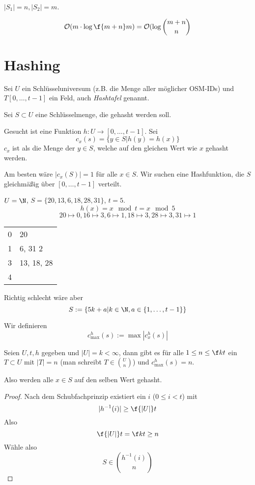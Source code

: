 \documentclass{mycourse}
\renewcommand{\O}{\mathcal{O}}
\begin{document}


\begin{note}[Nachtrag]
	$|S_1| = n, |S_2| = m$.

	\[
		\O(m\cdot \log \f{m+n}m) = \O (\log \binom{m+n}{n}
	\]
\end{note}


\section{Hashing}

Sei $U$ ein Schlüsseluniversum (z.B. die Menge aller möglicher OSM-IDs) und $T[0,\dotsc, t-1]$ ein Feld, auch \emph{Hashtafel} genannt.

Sei $S\subset U$ eine Schlüsselmenge, die gehasht werden soll.

Gesucht ist eine Funktion $h: U \to [0,\dotsc, t-1]$.
Sei 
\[
	c_x(s) = \{y\in S | h(y) = h(x)\}
\]
$c_x$ ist als die Menge der $y\in S$, welche auf den gleichen Wert wie $x$ gehasht werden.

Am besten wäre $|c_x(S)| = 1$ für alle $x\in S$.
Wir suchen eine Hashfunktion, die $S$ gleichmäßig über $[0,\dotsc, t-1]$ verteilt.

\begin{ex}
	$U = \N$, $S = \{20,13,6,18,28,31\}$, $t=5$.
	\[
		h(x) = x \mod t = x \mod 5
	\]
	\[
		20\mapsto 0, 16 \mapsto 3, 6 \mapsto 1, 18 \mapsto 3, 28 \mapsto 3, 31 \mapsto 1
	\]
	\begin{tabular}{r|l}
		0 & 20 \\
		1 & 6, 31
		2   \\
		3 & 13, 18, 28 \\
		4  \\
	\end{tabular}
	Richtig schlecht wäre aber
	\[
		S := \{5k + a | k\in \N, a\in \{1,\dotsc, t-1\}\}
	\]
\end{ex}


\begin{df}
	Wir definieren 
	\[
		c_{\max}^h(s) := \max |c_x^h (s)|
	\]
\end{df}


\begin{st}
	Seien $U, t, h$ gegeben und $|U| = k < \infty$, dann gibt es für alle $1\le n\le \f kt$ ein $T\subset U$ mit $|T|=n$ (man schreibt $T\in \binom{U}{n}$) und $c_{\max}^h(s) =n$.

	Also werden alle $x\in S$ auf den selben Wert gehasht.
	\begin{proof}
		Nach dem Schubfachprinzip existiert ein $i$ ($0\le i<t$) mit 
		\[
			|h^{-1}(i)| \ge \f{|U|}t
		\]
		Also
		\[
			\f {|U|}t = \f kt \ge n
		\]
		Wähle also
		\[
		S \in \binom{ h^{-1}(i)}{n}
		\]
	\end{proof}
\end{st}
\end{document}
